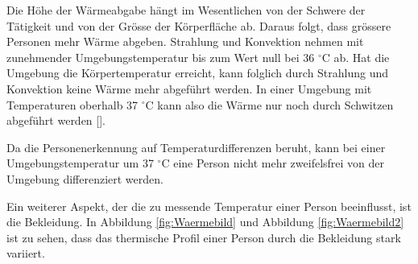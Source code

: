 Die Höhe der Wärmeabgabe hängt im Wesentlichen von der Schwere der Tätigkeit und von der Grösse der Körperfläche ab. Daraus folgt, dass grössere Personen mehr Wärme abgeben. Strahlung und Konvektion nehmen mit zunehmender Umgebungstemperatur bis zum Wert null bei 36 $^\circ$C ab. Hat die Umgebung die Körpertemperatur erreicht, kann folglich durch Strahlung und Konvektion keine Wärme mehr abgeführt werden. In einer Umgebung mit Temperaturen oberhalb 37 $^\circ$C kann also die Wärme nur noch durch Schwitzen abgeführt werden [\protect\cite{MenschWaerme}]. 

Da die Personenerkennung auf Temperaturdifferenzen beruht, kann bei einer Umgebungstemperatur um 37 $^\circ$C eine Person nicht mehr zweifelsfrei von der Umgebung differenziert werden. 

Ein weiterer Aspekt, der die zu messende Temperatur einer Person beeinflusst, ist die Bekleidung. In Abbildung \ref{fig:Waermebild} und Abbildung \ref{fig:Waermebild2} ist zu sehen, dass das thermische Profil einer Person durch die Bekleidung stark variiert.

